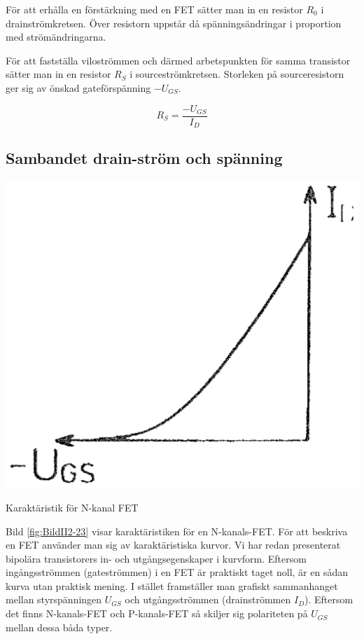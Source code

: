 För att erhålla en förstärkning med en FET sätter man in en resistor
\(R_0\) i drainströmkretsen. Över resistorn uppstår då
spänningsändringar i proportion med strömändringarna.

För att fastställa viloströmmen och därmed arbetspunkten för samma
transistor sätter man in en resistor \(R_S\) i sourceströmkretsen.
Storleken på sourceresistorn ger sig av önskad gateförspänning
\(-U_{GS}\).

\[	R_S = \dfrac{-U_{GS}}{I_D}	\]

\subsection{Sambandet drain-ström och spänning}

\begin{marginfigure}
\includegraphics[width=.5\textwidth]{images/cropped_pdfs/bild_2_2-23.pdf}
\caption{Karaktäristik för N-kanal FET}
\label{fig:BildII2-23}
\end{marginfigure}

Bild \ref{fig:BildII2-23} visar karaktäristiken för en N-kanals-FET.
För att beskriva en FET använder man sig av karaktäristiska kurvor.
Vi har redan presenterat bipolära transistorers in- och utgångsegenskaper i kurvform.
Eftersom ingångsströmmen (gateströmmen) i en FET är praktiskt taget noll, är en sådan kurva utan praktisk mening.
I stället framställer man grafiskt sammanhanget mellan styrspänningen
\(U_{GS}\) och utgångsströmmen (drainströmmen \(I_D\)).
Eftersom det finns N-kanals-FET och P-kanals-FET så skiljer sig polariteten på \(U_{GS}\) mellan dessa båda typer.
